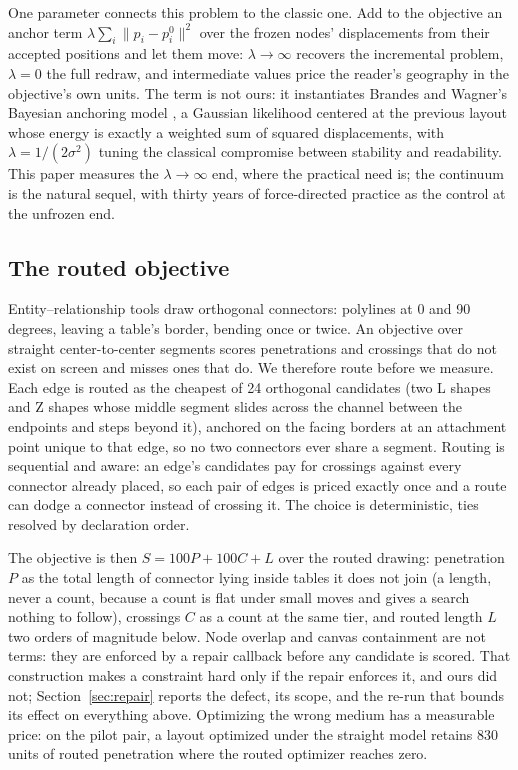 \documentclass[11pt]{article}
\begin{document}
One parameter connects this problem to the classic one. Add to the objective an anchor term
$\lambda \sum_i \lVert p_i - p_i^0 \rVert^2$ over the frozen nodes' displacements from
their accepted positions and let them move: $\lambda \to \infty$ recovers the incremental
problem, $\lambda = 0$ the full redraw, and intermediate values price the reader's
geography in the objective's own units. The term is not ours: it instantiates Brandes and
Wagner's Bayesian anchoring model \cite{bw97}, a Gaussian likelihood centered at the
previous layout whose energy is exactly a weighted sum of squared displacements, with
$\lambda = 1/(2\sigma^2)$ tuning the classical compromise between stability and
readability. This paper measures the $\lambda \to \infty$ end,
where the practical need is; the continuum is the natural sequel, with thirty years of
force-directed practice \cite{kobourov} as the control at the unfrozen end.

\subsection{The routed objective}\label{sec:objective}

Entity--relationship tools draw orthogonal connectors: polylines at 0 and 90 degrees,
leaving a table's border, bending once or twice. An objective over straight
center-to-center segments scores penetrations and crossings that do not exist on screen and
misses ones that do. We therefore route before we measure. Each edge is routed as the
cheapest of 24 orthogonal candidates (two L shapes and Z shapes whose middle segment slides
across the channel between the endpoints and steps beyond it), anchored on the facing
borders at an attachment point unique to that edge, so no two connectors ever share a
segment. Routing is sequential and aware: an edge's candidates pay for crossings against
every connector already placed, so each pair of edges is priced exactly once and a route
can dodge a connector instead of crossing it. The choice is deterministic, ties resolved by
declaration order.

The objective is then $S = 100P + 100C + L$ over the routed drawing: penetration $P$ as the
total length of connector lying inside tables it does not join (a length, never a count,
because a count is flat under small moves and gives a search nothing to follow), crossings
$C$ as a count at the same tier, and routed length $L$ two orders of magnitude below. Node
overlap and canvas containment are not terms: they are enforced by a repair callback before
any candidate is scored. That construction makes a constraint hard only if the repair
enforces it, and ours did not; Section~\ref{sec:repair} reports the defect, its scope, and
the re-run that bounds its effect on everything above.
Optimizing the wrong medium has a measurable price: on the pilot pair, a layout optimized
under the straight model retains 830 units of routed penetration where the routed optimizer
reaches zero.
\end{document}
